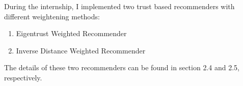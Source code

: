 	During the internship, I implemented two trust based recommenders with different weightening methods:
	\begin{enumerate}
		\item Eigentrust Weighted Recommender
		\item Inverse Distance Weighted Recommender
	\end{enumerate} 
	The details of these two recommenders can be found in section 2.4 and 2.5, respectively.